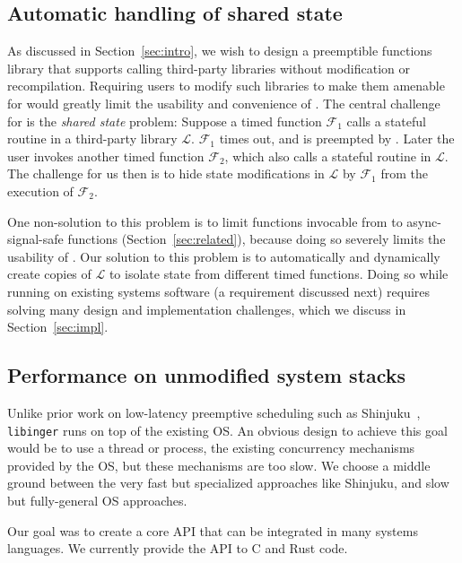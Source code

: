 \subsection{Automatic handling of shared state}

As discussed in Section~\ref{sec:intro}, we wish to design a preemptible
functions library that supports calling third-party libraries without
modification or recompilation. Requiring users to modify such libraries to make
them amenable for \libinger{} would greatly limit the usability and convenience
of \libinger{}. The central challenge for \libinger{} is the \emph{shared
state} problem: Suppose a timed function $\mathcal{F_1}$ calls a stateful
routine in a third-party library $\mathcal{L}$. $\mathcal{F_1}$ times out, and
is preempted by \libinger{}. Later the user invokes another timed function
$\mathcal{F_2}$, which also calls a stateful routine in $\mathcal{L}$. The
challenge for us then is to hide state modifications in $\mathcal{L}$ by
$\mathcal{F_1}$ from the execution of $\mathcal{F_2}$.

One non-solution to this problem is to limit functions invocable from
\libinger{} to async-signal-safe functions (Section~\ref{sec:related}), because
doing so severely limits the usability of \libinger{}. Our solution to this
problem is to automatically and dynamically create copies of $\mathcal{L}$ to
isolate state from different timed functions. Doing so while running on
existing systems software (a requirement discussed next) requires solving many
design and implementation challenges, which we discuss in
Section~\ref{sec:impl}.


\subsection{Performance on unmodified system stacks}

Unlike prior work on low-latency preemptive scheduling such as
Shinjuku~\cite{Kaffes:nsdi2019}, \texttt{libinger} runs on top of the existing
OS. An obvious design to achieve this goal would be to use a thread or process,
the existing concurrency mechanisms provided by the OS, but these mechanisms
are too slow. We choose a middle ground between the very fast but specialized
approaches like Shinjuku, and slow but fully-general OS approaches.

Our goal was to create a core \libinger{} API that can be integrated in many
systems languages. We currently provide the \libinger{} API to C and Rust code.


